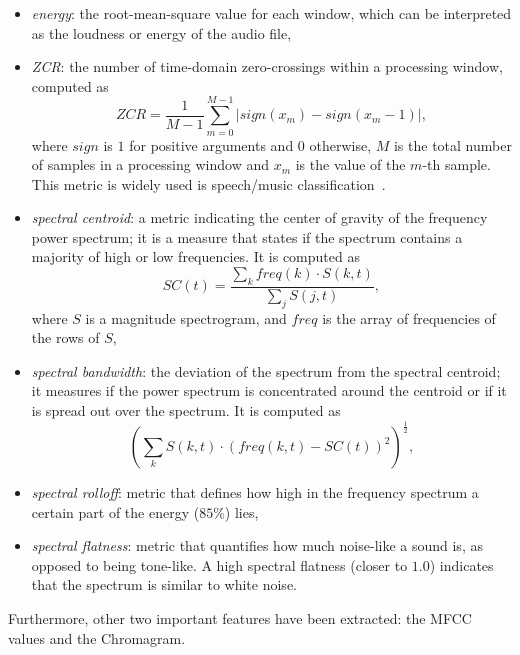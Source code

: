 \documentclass[oneside,openany]{article}
\begin{document}
    \begin{itemize}
    \item \textit{energy}: the root-mean-square value for each window, which can be interpreted as the loudness or energy of the audio file,
    \item \textit{ZCR}: the number of time-domain zero-crossings within a processing window, computed as \[ZCR=\frac{1}{M-1} \sum_{m=0}^{M-1} |sign(x_m)-sign(x_m-1)|,\] where $sign$ is $1$ for positive arguments and $0$ otherwise, $M$ is the total number of samples in a processing window and $x_m$ is the value of the $m$-th sample. 
    This metric is widely used is speech/music classification~\cite{Andersson1030847}. 
    \item \textit{spectral centroid}: a metric indicating the center of gravity of the frequency power spectrum; it is a measure that states if the spectrum contains a majority of high or low frequencies. It is computed as \[SC(t)=\frac{\sum_{k}freq(k)\cdot S(k,t)}{\sum_{j}S(j,t)},\] where $S$ is a magnitude spectrogram, and $freq$ is the array of frequencies of the rows of $S$,
    \item \textit{spectral bandwidth}: the deviation of the spectrum from the spectral centroid; it measures if the power spectrum is concentrated around the centroid or if it is spread out over the spectrum. It is computed as \[ (\sum_{k} S(k, t) \cdot (freq(k, t) - SC(t))^2)^\frac{1}{2},\] 
    \item \textit{spectral rolloff}: metric that defines how high in the frequency spectrum a certain part of the energy ($85\%$) lies,
    \item \textit{spectral flatness}: metric that quantifies how much noise-like a sound is, as opposed to being tone-like. A high spectral flatness (closer to $1.0$) indicates that the spectrum is similar to white noise.
    \end{itemize}
    
    \noindent Furthermore, other two important features have been extracted: the MFCC values and the Chromagram.
\end{document}
